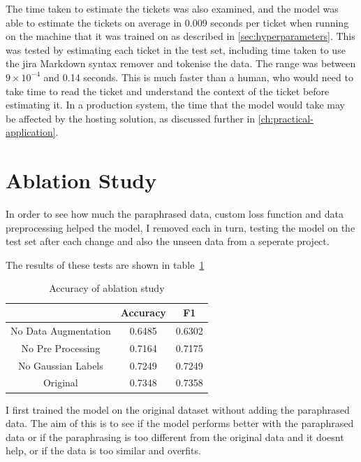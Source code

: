 \documentclass{UoYCSproject}
\begin{document}
The time taken to estimate the tickets was also examined, and the model was able to estimate the tickets on average in 0.009 seconds per ticket when running on the machine that it was trained on as described in \ref{sec:hyperparameters}.
This was tested by estimating each ticket in the test set, including time taken to use the jira Markdown syntax remover and tokenise the data.
The range was between $9 \times 10 ^{-4}$ and 0.14 seconds.
This is much faster than a human, who would need to take time to read the ticket and understand the context of the ticket before estimating it.
In a production system, the time that the model would take may be affected by the hosting solution, as discussed further in \ref{ch:practical-application}.

    \section{Ablation Study}
    In order to see how much the paraphrased data, custom loss function and data preprocessing helped the model, I removed each in turn, testing the model on the test set after each change and also the unseen data from a seperate project.

    The results of these tests are shown in table~\ref{tab:accuracy-ablation} \par

\begin{table}[h]
\centering
\begin{tabular}{ccc}
    \toprule

                     & Accuracy   & F1         \\
    \midrule
No Data Augmentation & 0.6485 & 0.6302 \\
No Pre Processing    & 0.7164 & 0.7175 \\
No Gaussian Labels   & 0.7249 & 0.7249 \\
Original             & 0.7348  & 0.7358 \\
    \bottomrule
\end{tabular}
    \caption{Accuracy of ablation study} \label{tab:accuracy-ablation}

\end{table}

    I first trained the model on the original dataset without adding the paraphrased data. The aim of this is to see if the model performs better with the paraphrased data or if the paraphrasing is too different from the original data and it doesnt help, or if the data is too similar and overfits.
\end{document}
